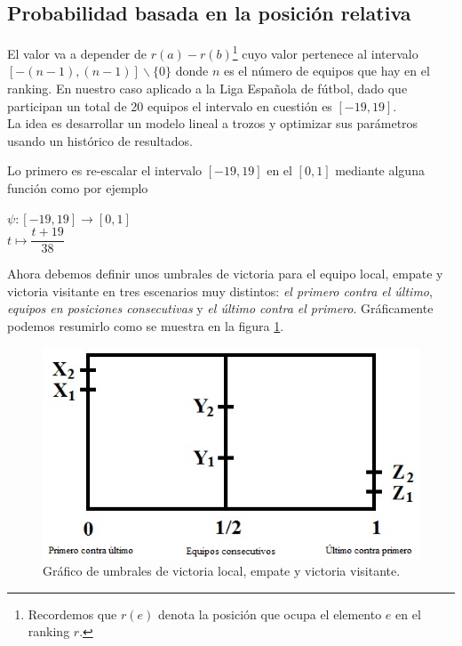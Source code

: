 \subsection{Probabilidad basada en la posición relativa}
El valor va a depender de $r(a)-r(b)$\footnote{Recordemos que $r(e)$ denota la posición que ocupa el elemento $e$ en el ranking $r$.} cuyo valor pertenece al intervalo $[-(n-1),(n-1)] \backslash \{0\}$ donde $n$ es el número de equipos que hay en el ranking. En nuestro caso aplicado a la Liga Española de fútbol, dado que participan un total de 20 equipos el intervalo en cuestión es $[-19,19]$.\\

La idea es desarrollar un modelo lineal a trozos y optimizar sus parámetros usando un histórico de resultados.\\

\newpage

Lo primero es re-escalar el intervalo $[-19,19]$ en el $[0,1]$ mediante alguna función como por ejemplo
\begin{center}
	$ \psi: [-19,19] \longrightarrow [0,1]$\\
	$ t \longmapsto \dfrac{t+19}{38}$
\end{center}

Ahora debemos definir unos umbrales de victoria para el equipo local, empate y victoria visitante en tres escenarios muy distintos: \textit{el primero contra el último}, \textit{equipos en posiciones consecutivas} y \textit{el último contra el primero}. Gráficamente podemos resumirlo como se muestra en la figura \ref{fig:umbrales}.

\begin{figure}[htb]
		\centering
		\includegraphics{images/umbrales.png}
		\caption{Gráfico de umbrales de victoria local, empate y victoria visitante.} \label{fig:umbrales}
\end{figure}

